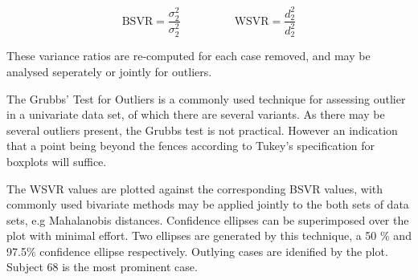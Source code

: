 \documentclass[12pt, a4paper]{report}
\theoremstyle{plain}
\theoremstyle{definition}
\theoremstyle{remark}
\begin{document}
	
	\[ \mbox{BSVR} = \frac{\sigma^2_2}{\sigma^2_2} \phantom{makespace}  \mbox{WSVR} = \frac{d^2_2}{d^2_2} \]
	
	These variance ratios are re-computed for each case removed, and may be analysed seperately or jointly for outliers.
	
	
	
	
	The Grubbs' Test for Outliers is a commonly used technique for assessing outlier in a univariate data set, of which there are several variants.
	As there may be several outliers present, the Grubbs test is not practical. However an indication that a point being beyond the fences according to Tukey's specification for boxplots will suffice.
	
	
	
	
	
	The WSVR values are plotted against the corresponding BSVR values, with commonly used bivariate methods may be applied jointly to the both sets of data sets, e.g Mahalanobis distances. Confidence ellipses can be superimposed over the plot with minimal effort. Two ellipses are generated by this technique, a 50 \% and 97.5\% confidence ellipse respectively. Outlying cases are idenified by the plot. Subject 68 is the most prominent case.
	
\end{document}
